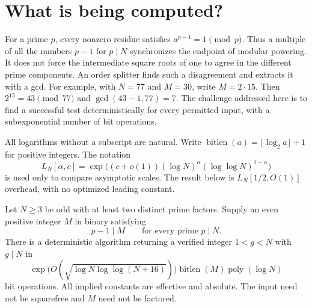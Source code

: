 \begin{abstract}
An order-splitting algorithm is given an integer $N$ and an even integer
$M$ known to be divisible by $p-1$ for every prime $p\mid N$; it must
turn that information into a proper factor.  We give a deterministic
algorithm with bit complexity
\[
 \exp\!\bigl(O(\sqrt{\log N\log\log(N+16)})\bigr)
 \operatorname{bitlen}(M)\operatorname{poly}(\log N).
\]
No factorization of $M$ is required.  The method replaces a full
multiquadratic character average by a sparse positive-semidefinite Gram
average.  A local decomposition retains ramified small primes, permitting
a family consisting only of the origin and coordinate vectors.  We
give the full compatible-root construction, ideal-character assembly,
fixed-degree enumeration algorithm, uniform prime-or-semiprime Burgess
estimate, explicit guards, and deterministic scale search.  The theorem
concerns splitting with a supplied exponent; constructing that exponent
for a general input is a separate computational task.
\end{abstract}

\tableofcontents

\section{What is being computed?}

For a prime $p$, every nonzero residue satisfies $a^{p-1}=1\pmod p$.
Thus a multiple of all the numbers $p-1$ for $p\mid N$ synchronizes the
endpoint of modular powering.  It does not force the intermediate
square roots of one to agree in the different prime components.
An order splitter finds such a disagreement and extracts it with a gcd.
For example, with $N=77$ and $M=30$, write $M=2\cdot15$.
Then $2^{15}=43\pmod{77}$ and
$\gcd(43-1,77)=7$.  The challenge addressed here is to find a successful
test deterministically for every permitted input, with a subexponential
number of bit operations.

All logarithms without a subscript are natural.  Write
$\operatorname{bitlen}(a)=\lfloor\log_2a\rfloor+1$ for positive integers.
The notation
\[
 L_N[\alpha,c]=
 \exp\bigl((c+o(1))(\log N)^\alpha(\log\log N)^{1-\alpha}\bigr)
\]
is used only to compare asymptotic scales.  The result below is
$L_N[1/2,O(1)]$ overhead, with no optimized leading constant.

\begin{theorem}
\label{thm:os-main}
Let $N\geq3$ be odd with at least two distinct prime factors.  Supply an
even positive integer $M$ in binary satisfying
\[
 p-1\mid M\qquad\text{for every prime }p\mid N.
\]
There is a deterministic algorithm returning a verified integer
$1<g<N$ with $g\mid N$ in
\begin{equation}
 \exp\!\bigl(O(\sqrt{\log N\log\log(N+16)})\bigr)
 \operatorname{bitlen}(M)\operatorname{poly}(\log N)
 \label{eq:os-cost}
\end{equation}
bit operations.  All implied constants are effective and absolute.
The input need not be squarefree and $M$ need not be factored.
\end{theorem}

